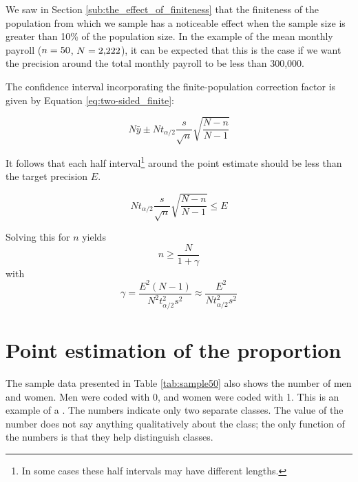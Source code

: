 We saw in Section \ref{sub:the_effect_of_finiteness} that the finiteness of the population from which we sample has a noticeable effect when the sample size is greater than 10\% of the population size. In the example of the mean monthly payroll ($n = \EstMeanSampleSize$, $N = \EstPopulationSize$), it can be expected that this is the case if we want the precision around the total monthly payroll to be less than 300,000.

The confidence interval incorporating the finite-population correction factor is given by Equation \ref{eq:two-sided_finite}:

\begin{equation*}
N \bar{y} \pm N t_{\alpha/2} \frac{s}{\sqrt{n}}\sqrt{\frac{N-n}{N-1}}
\end{equation*}

It follows that each half interval\footnote{In some cases these half intervals may have different lengths.} around the point estimate should be less than the target precision $E$.

\begin{equation*}
  N t_{\alpha/2} \frac{s}{\sqrt{n}} \sqrt{\frac{N - n}{N-1}} \leq E
\end{equation*}

Solving this for $n$ yields
\begin{equation}
  n \geq \frac{N}{1 + \gamma}
\end{equation}
with
\begin{equation}
  \gamma = \frac{E^2 (N-1)}{N^2 t_{\alpha/2}^2 s^2} \approx \frac{E^2}{N t_{\alpha/2}^2 s^2}
\end{equation}



\section{Point estimation of the proportion} %
\label{sec:point_estimation_of_the_proportion}


The sample data presented in Table \ref{tab:sample50} also shows the number of men and women. Men were coded with 0, and women were coded with 1. This is an example of a . The numbers indicate only two separate classes. The value of the number does not say anything qualitatively about the class; the only function of the numbers is that they help distinguish classes.

